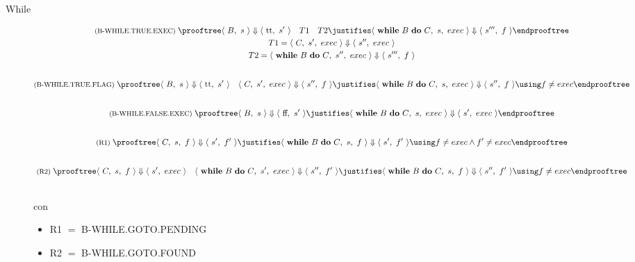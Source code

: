 \begin{description}
\item[While]
\begin{gather*}
  \rulename{B-WHILE.TRUE.EXEC}
  \prooftree
    \config{B}{s} \Downarrow \config{\textrm{tt}}{s'}
      \quad T1
      \quad T2
    \justifies
        \configG{\textrm{$\kw{while}$ $B$ $\kw{do}$ $C$}}{s}{exec} \Downarrow \config{s'''}{f}
  \endprooftree
  \\
  T1 = \configG{C}{s'}{exec} \Downarrow \config{s''}{exec} \\
  T2 = \configG{\textrm{$\kw{while}$ $B$ $\kw{do}$ $C$}}{s''}{exec} \Downarrow \config{s'''}{f}
  \\[2em]
  \rulename{B-WHILE.TRUE.FLAG}
  \prooftree
    \config{B}{s} \Downarrow \config{\textrm{tt}}{s'}
      \quad \configG{C}{s'}{exec} \Downarrow \config{s''}{f}
    \justifies
      \configG{\textrm{$\kw{while}$ $B$ $\kw{do}$ $C$}}{s}{exec} \Downarrow \config{s''}{f}
    \using f \neq exec
  \endprooftree
  \\[2em]
  \rulename{B-WHILE.FALSE.EXEC}
  \prooftree
    \config{B}{s} \Downarrow \config{\textrm{ff}}{s'}
    \justifies
      \configG{\textrm{$\kw{while}$ $B$ $\kw{do}$ $C$}}{s}{exec} \Downarrow \config{s'}{exec}
  \endprooftree
  \\[2em]
  \rulename{R1}
  \prooftree
    \configG{C}{s}{f} \Downarrow \config{s'}{f'}
    \justifies
    \configG{\textrm{$\kw{while}$ $B$ $\kw{do}$ $C$}}{s}{f} \Downarrow \config{s'}{f'}
    \using f \neq exec \land f' \neq exec
  \endprooftree
  \\[2em]
  \rulename{R2}
  \prooftree
    \configG{C}{s}{f} \Downarrow \config{s'}{exec}
      \quad \configG{\textrm{$\kw{while}$ $B$ $\kw{do}$ $C$}}{s'}{exec} \Downarrow \config{s''}{f'}
    \justifies
      \configG{\textrm{$\kw{while}$ $B$ $\kw{do}$ $C$}}{s}{f} \Downarrow \config{s''}{f'}
    \using f \neq exec
  \endprooftree
  \\[2em]
\end{gather*}
con
\begin{itemize}
  \item R1 $=$ B-WHILE.GOTO.PENDING
  \item R2 $=$ B-WHILE.GOTO.FOUND
\end{itemize}

\end{description}

